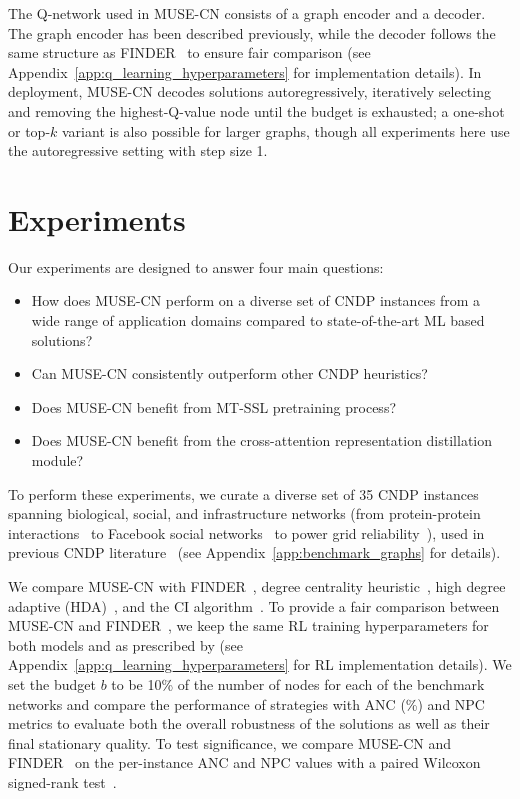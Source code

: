 \documentclass{article}
\begin{document}
The Q-network used in MUSE-CN consists of a graph encoder and a decoder. The graph encoder has been described previously, while the decoder follows the same structure as FINDER~\cite{fan2020finding} to ensure fair comparison (see Appendix~\ref{app:q_learning_hyperparameters} for implementation details). In deployment, MUSE-CN decodes solutions autoregressively, iteratively selecting and removing the highest-Q-value node until the budget is exhausted; a one-shot or top-$k$ variant is also possible for larger graphs, though all experiments here use the autoregressive setting with step size 1.




\section{Experiments}
Our experiments are designed to answer four main questions: 
\begin{itemize}[leftmargin=*]
    \item How does MUSE-CN perform on a diverse set of CNDP instances from a wide range of application domains compared to state-of-the-art ML based solutions?
    \item Can MUSE-CN consistently outperform other CNDP heuristics?
    \item Does MUSE-CN benefit from MT-SSL pretraining process?
    \item Does MUSE-CN benefit from the cross-attention representation distillation module?
\end{itemize}

To perform these experiments, we curate a diverse set of 35 CNDP instances spanning biological, social, and infrastructure networks (from protein-protein interactions~\cite{zitnik2017predicting} to Facebook social networks~\cite{fan2020finding} to power grid reliability~\cite{networkrepo}), used in previous CNDP literature~\cite{zhou2018memetic,zhou2020variable,zitnik2017predicting,fan2020finding} (see Appendix~\ref{app:benchmark_graphs} for details).

We compare MUSE-CN with FINDER~\cite{fan2020finding}, degree centrality heuristic~\cite{zhang2017degree}, high degree adaptive (HDA)~\cite{pastor2001epidemic}, and the CI algorithm~\cite{morone2016collective}. To provide a fair comparison between MUSE-CN and FINDER~\cite{fan2020finding}, we keep the same RL training hyperparameters for both models and as prescribed by \citet{fan2020finding} (see Appendix~\ref{app:q_learning_hyperparameters} for RL implementation details). We set the budget $b$ to be 10\% of the number of nodes for each of the benchmark networks and compare the performance of strategies with ANC (\%) and NPC metrics to evaluate both the overall robustness of the solutions as well as their final stationary quality. To test significance, we compare MUSE-CN and FINDER~\cite{fan2020finding} on the per-instance ANC and NPC values with a paired Wilcoxon signed-rank test~\cite{demvsar2006statistical}.
\end{document}
